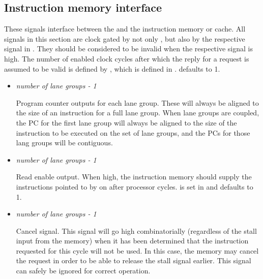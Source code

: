\documentclass[main.tex]{subfiles}
\begin{document}
\subsection{Instruction memory interface}

These signals interface between the \rvex{} and the instruction memory or cache. All signals in this section are clock gated by not only , but also by the respective signal in . They should be considered to be invalid when the respective  signal is high. The number of enabled clock cycles after which the reply for a request is assumed to be valid is defined by , which is defined in .  defaults to 1.

\begin{itemize}

  \item {}\textit{number of lane groups - 1}
  
  Program counter outputs for each lane group. These will always be aligned to the size of an instruction for a full lane group. When lane groups are coupled, the PC for the first lane group will always be aligned to the size of the instruction to be executed on the set of lane groups, and the PCs for those lang groups will be contiguous.
  
  \vspace{1em}
  \item {}\textit{number of lane groups - 1}
  
  Read enable output. When high, the instruction memory should supply the instructions pointed to by  on  after  processor cycles.  is set in  and defaults to 1.
  
  \vspace{1em}
  \item {}\textit{number of lane groups - 1}
  
  Cancel signal. This signal will go high combinatorially (regardless of the stall input from the memory) when it has been determined that the instruction requested for this cycle will not be used. In this case, the memory may cancel the request in order to be able to release the stall signal earlier. This signal can safely be ignored for correct operation.
  

\end{itemize}
\end{document}
